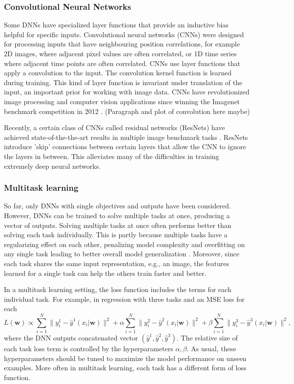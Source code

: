 \subsubsection{Convolutional Neural Networks}
\label{sec:CNN}
Some DNNs have specialized layer functions that provide an inductive bias helpful for specific inputs. Convolutional neural networks (CNNs) \citep{lecun_convolutional_1998} were designed for processing inputs that have neighbouring position correlations, for example 2D images, where adjacent pixel values are often correlated, or 1D time series where adjacent time points are often correlated. CNNs use layer functions that apply a convolution to the input. The convolution kernel function is learned during training. This kind of layer function is invariant under translation of the input, an important prior for working with image data.
CNNs have revolutionized image processing and computer vision applications since winning the Imagenet benchmark competition in 2012 \citep{krizhevsky_imagenet_2012}.  
(Paragraph and plot of convolution here maybe)

Recently, a certain class of CNNs called residual networks (ResNets) have achieved state-of-the-the-art results in multiple image benchmark tasks \citep{he_deep_2015}. ResNets introduce 'skip' connections between certain layers that allow the CNN to ignore the layers in between. This alleviates many of the difficulties in training extremely deep neural networks.

\subsubsection{Multitask learning}
\label{sec:multi}
So far, only DNNs with single objectives and outputs have been considered. However, DNNs can be trained to solve multiple tasks at once, producing a vector of outputs. Solving multiple tasks at once often performs better than solving each task individually. This is partly because multiple tasks have a regularizing effect on each other, penalizing model complexity and overfitting on any single task leading to better overall model generalization \citep{zhang_survey_2021}. Moreover, since each task shares the same input representation, e.g., an image, the features learned for a single task can help the others train faster and better.

In a multitask learning setting, the loss function includes the terms for each individual task. For example, in regression with three tasks and an MSE loss for each
\begin{equation}
    L(\mathbf{w}) \propto \sum^N_{i=1}\|y^1_i - \hat{y}^1(x_i|\mathbf{w})\|^2 + \alpha\sum^N_{i=1}\|y^2_i - \hat{y}^2(x_i|\mathbf{w})\|^2 + \beta\sum^N_{i=1}\|y^3_i - \hat{y}^3(x_i|\mathbf{w})\|^2,
    \label{eqn:megloss}
\end{equation}
where the DNN outputs concatenated vector $(\hat{y}^1,\hat{y}^2,\hat{y}^3)$.
The relative size of each task loss term is controlled by the hyperparameters $\alpha,\beta$. As usual, these hyperparameters should be tuned to maximize the model performance on unseen examples. More often in multitask learning, each task has a different form of loss function.

